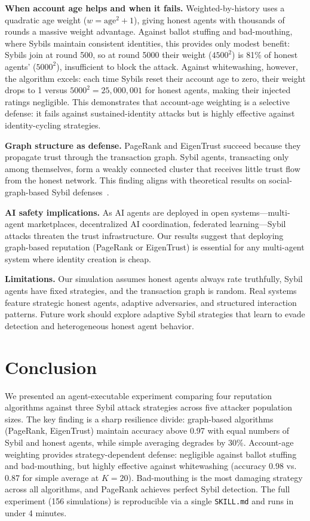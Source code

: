 \documentclass[11pt]{article}
\begin{document}
\textbf{When account age helps and when it fails.}
Weighted-by-history uses a quadratic age weight ($w = \text{age}^2 + 1$), giving honest agents with thousands of rounds a massive weight advantage.
Against ballot stuffing and bad-mouthing, where Sybils maintain consistent identities, this provides only modest benefit: Sybils join at round 500, so at round 5000 their weight ($4500^2$) is 81\% of honest agents' ($5000^2$), insufficient to block the attack.
Against whitewashing, however, the algorithm excels: each time Sybils reset their account age to zero, their weight drops to 1 versus $5000^2 = 25{,}000{,}001$ for honest agents, making their injected ratings negligible.
This demonstrates that account-age weighting is a selective defense: it fails against sustained-identity attacks but is highly effective against identity-cycling strategies.

\textbf{Graph structure as defense.}
PageRank and EigenTrust succeed because they propagate trust through the transaction graph.
Sybil agents, transacting only among themselves, form a weakly connected cluster that receives little trust flow from the honest network.
This finding aligns with theoretical results on social-graph-based Sybil defenses~\cite{levine2006survey}.

\textbf{AI safety implications.}
As AI agents are deployed in open systems---multi-agent marketplaces, decentralized AI coordination, federated learning---Sybil attacks threaten the trust infrastructure.
Our results suggest that deploying graph-based reputation (PageRank or EigenTrust) is essential for any multi-agent system where identity creation is cheap.

\textbf{Limitations.}
Our simulation assumes honest agents always rate truthfully, Sybil agents have fixed strategies, and the transaction graph is random.
Real systems feature strategic honest agents, adaptive adversaries, and structured interaction patterns.
Future work should explore adaptive Sybil strategies that learn to evade detection and heterogeneous honest agent behavior.

\section{Conclusion}

We presented an agent-executable experiment comparing four reputation algorithms against three Sybil attack strategies across five attacker population sizes.
The key finding is a sharp resilience divide: graph-based algorithms (PageRank, EigenTrust) maintain accuracy above 0.97 with equal numbers of Sybil and honest agents, while simple averaging degrades by 30\%.
Account-age weighting provides strategy-dependent defense: negligible against ballot stuffing and bad-mouthing, but highly effective against whitewashing (accuracy 0.98 vs. 0.87 for simple average at $K{=}20$).
Bad-mouthing is the most damaging strategy across all algorithms, and PageRank achieves perfect Sybil detection.
The full experiment (156 simulations) is reproducible via a single \texttt{SKILL.md} and runs in under 4 minutes.
\end{document}
